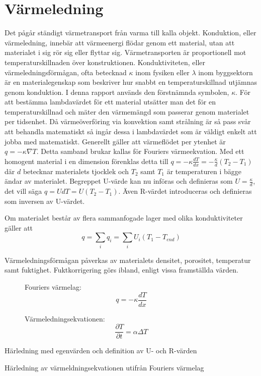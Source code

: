 \section{Värmeledning}\label{sec:heatconduction}

Det pågår ständigt värmetransport från varma till kalla objekt. Konduktion, eller värmeledning, innebär att värmeenergi flödar genom ett material, utan att materialet i sig rör sig eller flyttar sig. Värmetransporten är proportionell mot temperaturskillnaden över konstruktionen. Konduktiviteten, eller värmeledningsförmågan, ofta betecknad $\kappa$ inom fysiken eller $\lambda$ inom byggsektorn är en materialegenskap som beskriver hur snabbt en temperaturskillnad utjämnas genom konduktion. I denna rapport används den förstnämnda symbolen, $\kappa$. För att bestämma lambdavärdet för ett material utsätter man det för en temperaturskillnad och mäter den värmemängd som passerar genom materialet per tidsenhet. Då värmeöverföring via konvektion samt strålning är så pass svår att behandla matematiskt så ingår dessa i lambdavärdet som är väldigt enkelt att jobba med matematiskt. Generellt gäller att värmeflödet per ytenhet är $q = - \kappa \nabla T$. Detta samband brukar kallas för Fouriers värmeekvation. Med ett homogent material i en dimension förenklas detta till $q = -\kappa \frac{dT}{dx} = -\frac{\kappa}{d}\left( T_2-T_1\right)$ där $d$ betecknar materialets tjocklek och $T_2$ samt $T_1$ är temperaturen i bägge ändar av materialet. Begreppet U-värde kan nu införas och definieras som $U = \frac{\kappa}{d}$, det vill säga $q = UdT = U\left( T_2-T_1 \right)$. Även R-värdet introduceras och definieras som inversen av U-värdet.

Om materialet består av flera sammanfogade lager med olika konduktiviteter gäller att
\begin{equation}
q = \sum_i q_i = \sum_i U_i \left( T_{1} - T_{end}\right)
\end{equation} 

Värmeledningsförmågan påverkas av materialets densitet, porositet, temperatur samt fuktighet. Fuktkorrigering görs ibland, enligt vissa framställda värden.


\begin{figure}[htp]
\begin{boxedminipage}{\textwidth}
Fouriers värmelag:
\begin{equation}
q = -\kappa \frac{dT}{dx}
\end{equation}

Värmeledningsekvationen:
\begin{equation}
\frac{\partial T}{\partial t} = \alpha \Delta T
\end{equation}

\end{boxedminipage}
\end{figure}


Härledning med egenvärden och definition av U- och R-värden

Härledning av värmeldningsekvationen utifrån Fouriers värmelag

